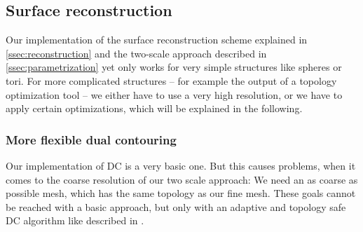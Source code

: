 \subsection{Surface reconstruction}
Our implementation of the surface reconstruction scheme explained in \autoref{ssec:reconstruction} and the two-scale approach described in \autoref{ssec:parametrization} yet only works for very simple structures like spheres or tori. For more complicated structures -- for example the output of a topology optimization tool -- we either have to use a very high resolution, or we have to apply certain optimizations, which will be explained in the following.

\subsubsection{More flexible dual contouring}
Our implementation of \ac{DC} is a very basic one. But this causes problems, when it comes to the coarse resolution of our two scale approach: We need an as coarse as possible mesh, which has the same topology as our fine mesh. These goals cannot be reached with a basic approach, but only with an adaptive and topology safe \ac{DC} algorithm like described in \cite{Hermite2002}.

